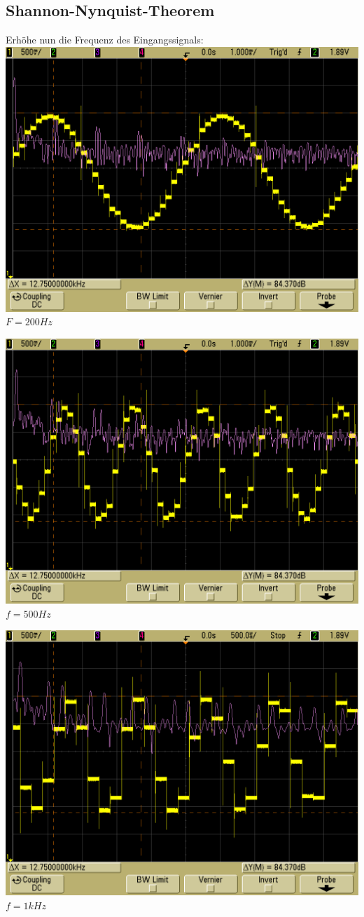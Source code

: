 \documentclass[compress,11pt]{beamer}
\begin{document}
\subsection{Shannon-Nynquist-Theorem}
\begin{frame}
Erhöhe nun die Frequenz des Eingangssignals:\\
\includegraphics[width=.7\textwidth]{../scope_60}\\
$F = 200 Hz$
\end{frame}
\begin{frame}\includegraphics[width=.7\textwidth]{../scope_62}\\
$f = 500 Hz$
\end{frame}
\begin{frame}
\includegraphics[width=.7\textwidth]{../scope_63}\\
$f = 1 kHz$
\end{frame}
\end{document}
